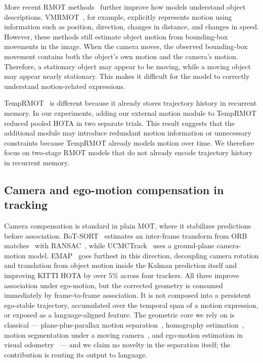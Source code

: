 \documentclass[sigconf,anonymous,nonacm]{acmart}
\begin{document}
More recent RMOT methods~\cite{mlstrack,deeprmot,cdrmot,tellmewhat} further improve how models understand object descriptions. VMRMOT~\cite{vmrmot}, for example, explicitly represents motion using information such as position, direction, changes in distance, and changes in speed. However, these methods still estimate object motion from bounding-box movements in the image. When the camera moves, the observed bounding-box movement contains both the object’s own motion and the camera’s motion. Therefore, a stationary object may appear to be moving, while a moving object may appear nearly stationary. This makes it difficult for the model to correctly understand motion-related expressions.

TempRMOT~\cite{temprmot} is different because it already stores trajectory history in recurrent memory. In our experiments, adding our external motion module to TempRMOT reduced pooled HOTA in two separate trials. This result suggests that the additional module may introduce redundant motion information or unnecessary constraints because TempRMOT already models motion over time. We therefore focus on two-stage RMOT models that do not already encode trajectory history in recurrent memory.

\subsection{Camera and ego-motion compensation in tracking}
Camera compensation is standard in plain MOT, where it stabilizes predictions before association. BoT-SORT~\cite{botsort} estimates an inter-frame transform from ORB matches~\cite{orb} with RANSAC~\cite{ransac}, while UCMCTrack~\cite{ucmctrack} uses a ground-plane camera-motion model. EMAP~\cite{emap} goes furthest in this direction, decoupling camera rotation and translation from object motion inside the Kalman prediction itself and improving KITTI HOTA by over $5\%$ across four trackers. All three improve association under ego-motion, but the corrected geometry is consumed immediately by frame-to-frame association. It is not composed into a persistent ego-stable trajectory, accumulated over the temporal span of a motion expression, or exposed as a language-aligned feature. The geometric core we rely on is classical --- plane-plus-parallax motion separation~\cite{iranianandan}, homography estimation~\cite{hartleyzisserman}, motion segmentation under a moving camera~\cite{bideau}, and ego-motion estimation in visual odometry~\cite{scaramuzza} --- and we claim no novelty in the separation itself; the contribution is routing its output to language.
\end{document}
